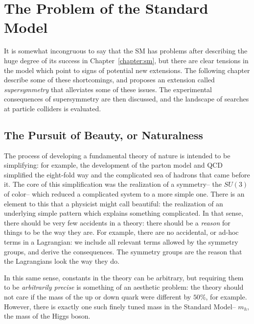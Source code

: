 \label{chapter:susy}

\section{The Problem of the Standard Model}
\label{chapter:susy:problems}

It is somewhat incongruous to say that the SM has problems after describing the huge degree of its success in Chapter~\ref{chapter:sm}, but there are clear tensions in the model which point to signs of potential new extensions. The following chapter describe some of these shortcomings, and proposes an extension called \textit{supersymmetry} that alleviates some of these issues. The experimental consequences of supersymmetry are then discussed, and the landscape of searches at particle colliders is evaluated.

\subsection{The Pursuit of Beauty, or Naturalness}

The process of developing a fundamental theory of nature is intended to be simplifying: for example, the development of the parton model and QCD simplified the eight-fold way and the complicated sea of hadrons  that came before it. The core of this simplification was the realization of a symmetry-- the $SU(3)$ of color-- which reduced a complicated system to a more simple one. There is an element to this that a physicist might call beautiful: the realization of an underlying simple pattern which explains something complicated. In that sense, there should be very few accidents in a theory: there should be a \textit{reason} for things to be the way they are. For example, there are no accidental, or ad-hoc terms in a Lagrangian: we include all relevant terms allowed by the symmetry groups, and derive the consequences. The symmetry groups are the reason that the Lagrangians look the way they do.

In this same sense, constants in the theory can be arbitrary, but requiring them to be \textit{arbitrarily precise} is something of an aesthetic problem: the theory should not care if the mass of the up or down quark were different by $50\%$, for example. However, there is exactly one such finely tuned mass in the Standard Model-- $m_h$, the mass of the Higgs boson. 

